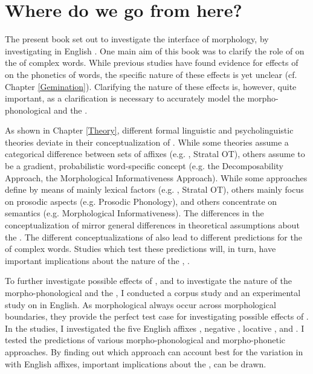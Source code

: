 \chapter{Where do we go from here?} \label{final conclusion}

The present book set out to investigate the interface of morphology,  by investigating  in English . 
One main aim of this book was to clarify the role of  on the  of complex words. 
While previous studies have found evidence for effects of  on the phonetics of words, the specific nature of these effects is yet unclear (cf. Chapter \ref{Gemination}). 
 Clarifying the nature of these effects is, however, quite important, as a clarification is necessary to accurately model the morpho-phonological and the . 

As shown in Chapter \ref{Theory}, different formal linguistic and psycholinguistic theories deviate in their conceptualization of  . While some theories assume a categorical difference between sets of affixes (e.g. , Stratal OT), others assume  to be a gradient, probabilistic word-specific concept (e.g. the Decomposability Approach, the Morphological Informativeness Approach). 
While some approaches define  by means of mainly lexical factors (e.g. , Stratal OT), others mainly focus on prosodic aspects (e.g. Prosodic Phonology), and others concentrate on semantics (e.g. Morphological Informativeness).  The differences in the conceptualization of  mirror general differences in theoretical assumptions about the . 
 The different conceptualizations of  also lead to different predictions for the  of complex words.
 Studies which test these predictions will, in turn, have important implications about the nature of the , .
 
To further investigate possible effects of , and to investigate the nature of the morpho-phonological and the , I conducted a corpus study and an experimental study on  in English.  As morphological  always occur across morphological boundaries, they provide the perfect test case for investigating possible effects of . 
 In the studies, I investigated the five English affixes , negative , locative ,  and . I tested the predictions of various morpho-phonological and morpho-phonetic approaches. By finding out which approach can account best for the variation in  with English affixes, important implications about the ,  can be drawn.



